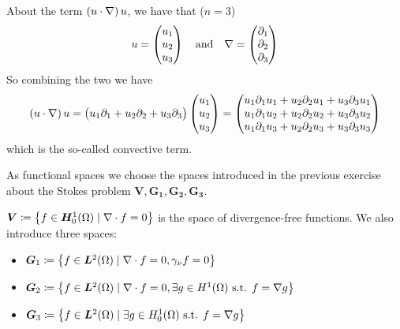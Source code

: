\begin{remark}
    About the term \(\left( u \cdot \nabla \right) u\), we have that (\(n = 3\))
    \[
        u = \begin{pmatrix}
            u_1 \\
            u_2 \\
            u_3
        \end{pmatrix} \quad \text{and} \quad \nabla = \begin{pmatrix}
            \partial_1 \\
            \partial_2 \\
            \partial_3
        \end{pmatrix}
    \]
    So combining the two we have
    \[
        \begin{split}
            \left( u \cdot \nabla \right) u = \begin{pmatrix}
                u_1 \partial_1 + u_2 \partial_2 + u_3 \partial_3
            \end{pmatrix} \begin{pmatrix}
                u_1 \\
                u_2 \\
                u_3
            \end{pmatrix} = \begin{pmatrix}
                u_1 \partial_1 u_1 + u_2 \partial_2 u_1 + u_3 \partial_3 u_1 \\
                u_1 \partial_1 u_2 + u_2 \partial_2
                u_2 + u_3 \partial_3 u_2 \\
                u_1 \partial_1 u_3 + u_2 \partial_2 u_3 + u_3 \partial_3 u_3
            \end{pmatrix}
        \end{split}
    \]
    which is the so-called convective term.
\end{remark}
As functional spaces we choose the spaces introduced in the previous exercise about the Stokes problem \(\bm{V}, \bm{G_1}, \bm{G_2}, \bm{G_3}\). 
\begin{remark}
    \(\bm{V} \coloneqq \left\{ f \in \bm{H}^1_0(\Omega) \mid \nabla \cdot f = 0 \right\}\) is the space of divergence-free functions.
    We also introduce three spaces:
    \begin{itemize}
        \item \(\bm{G}_1 \coloneqq \left\{ f \in \bm{L}^2(\Omega) \mid \nabla \cdot f = 0, \gamma_\nu f = 0 \right\}\)
        \item \(\bm{G}_2 \coloneqq \left\{ f \in \bm{L}^2(\Omega) \mid \nabla \cdot f = 0, \exists g \in H^1(\Omega) \text{ s.t. } f = \nabla g \right\}\)
        \item \(\bm{G}_3 \coloneqq \left\{ f \in \bm{L}^2(\Omega) \mid \exists g \in H^1_0(\Omega) \text{ s.t. } f = \nabla g \right\}\)
    \end{itemize}
\end{remark}
